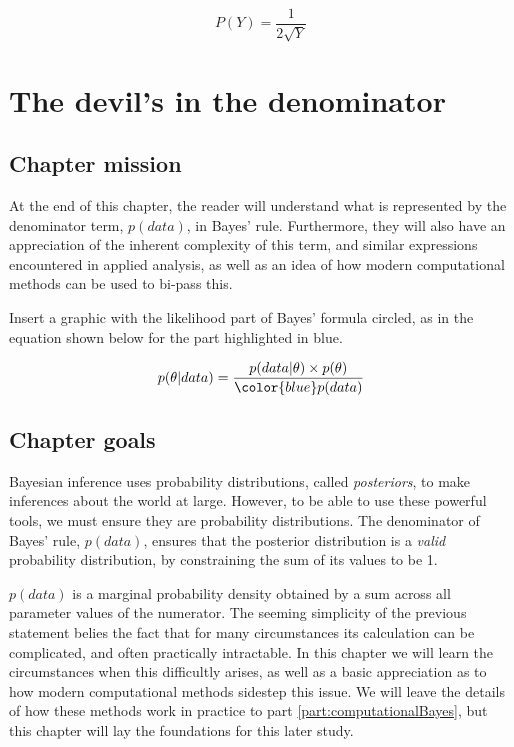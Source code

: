\documentclass[11pt,fullpage]{book}
\begin{document}
\begin{equation}\label{eq:Prior_appChangeOfVariablesSolved}
P(Y) = \frac{1}{2\sqrt{Y}}
\end{equation}


\chapter{The devil's in the denominator}\label{chap:denominator}
\section{Chapter mission}
At the end of this chapter, the reader will understand what is represented by the denominator term, $p(data)$, in Bayes' rule. Furthermore, they will also have an appreciation of the inherent complexity of this term, and similar expressions encountered in applied analysis, as well as an idea of how modern computational methods can be used to bi-pass this.

Insert a graphic with the likelihood part of Bayes' formula circled, as in the equation shown below for the part highlighted in blue.

\begin{equation}
p(\theta|data) = \frac{p(data|\theta)\times p(\theta)}{{\color{blue}p(data)}}
\end{equation}\label{eq:Denominator_BayesHighlighted}


\section{Chapter goals}
Bayesian inference uses probability distributions, called \textit{posteriors}, to make inferences about the world at large. However, to be able to use these powerful tools, we must ensure they are probability distributions. The denominator of Bayes' rule, $p(data)$, ensures that the posterior distribution is a \textit{valid} probability distribution, by constraining the sum of its values to be 1. 

$p(data)$ is a marginal probability density obtained by a sum across all parameter values of the numerator. The seeming simplicity of the previous statement belies the fact that for many circumstances its calculation can be complicated, and often practically intractable. In this chapter we will learn the circumstances when this difficultly arises, as well as a basic appreciation as to how modern computational methods sidestep this issue. We will leave the details of how these methods work in practice to part \ref{part:computationalBayes}, but this chapter will lay the foundations for this later study.
\end{document}
